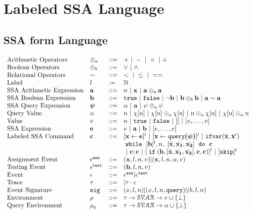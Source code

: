 \section{Labeled SSA Language}
%
%
\subsection{SSA form Language}
\[
\begin{array}{llll}
 \mbox{Arithmetic Operators} 
& \oplus_a & ::= & + ~|~ - ~|~ \times 
%
~|~ \div \\  
\mbox{Boolean Operators} 
& \oplus_b & ::= & \lor ~|~ \land
\\
\mbox{Relational Operators} 
& \sim & ::= & < ~|~ \leq ~|~ == 
\\  
%
\mbox{Label} 
& l & := & \mathbb{N} 
\\ 
%
\mbox{SSA Arithmetic Expression} 
& \saexpr & ::= & 
n ~|~ \ssa{x} ~|~ \saexpr \oplus_a \saexpr  
\\
%
\mbox{SSA Boolean Expression} & \sbexpr & ::= & 
	\etrue ~|~ \efalse  ~|~ \neg \sbexpr
	 ~|~ \sbexpr \oplus_b \sbexpr
	~|~ \saexpr \sim \saexpr 
	\\
%
\mbox{SSA Query Expression} 
& \ssa{\qexpr} & ::= 
& { \qval ~|~ \saexpr ~|~ \qexpr \oplus_a \qexpr} 
\\
%
\mbox{Query Value} & \qval & ::= 
& {n ~|~ \chi[n] ~|~ \chi[n] \oplus_a  \chi[n] ~|~ n \oplus_a  \chi[n]
~|~ \chi[n] \oplus_a  n}
\\
%
\mbox{Value} 
& v & ::= & { n \sep \etrue \sep \efalse ~|~ [] ~|~ [v, \dots, v]}  
\\
%
\mbox{SSA Expression} & \sexpr & ::= & v ~|~ \saexpr \sep \sbexpr ~|~ [\expr, \dots, \expr]
\\	
%
\mbox{Labeled SSA Command} 
& \ssa{c} & ::= &   [\assign {\ssa{x}}{ \ssa{\expr}}]^{l} ~|~  [\assign {\ssa{x} } {\ssa{\query(\qexpr)}}]^{l}
%
~|~  {{\eifvar(\bar{\ssa{x}}, \bar{\ssa{x}}')}} 
%
\\ 
&&& 
{\ewhile ~ [ \sbexpr ]^{l} , n,
~ 
[\bar{\ssa{x}}, \bar{\ssa{x_1}}, \bar{\ssa{x_2}}] 
~ \edo ~  \ssa{c} }
\\
&&&
~|~ \ssa{c};\ssa{c}  
~|~ [\eif(\sbexpr, [\bar{\ssa{x}}, \bar{\ssa{x_1}}, \bar{\ssa{x_2}}] , \ssa{c}, \ssa{c})]^l 
~|~ [\eskip]^{l} 
\\
%
\mbox{Assignment Event} 
& \asnevent & ::= & (\ssa{x}, l, n, v) | (\ssa{x}, l, n, \qval, v)
\\
%
\mbox{Testing Event} 
& \testevent & ::= & (\sbexpr, l, n, v)
\\
%
\mbox{Event} 
& \event & ::= & \asnevent | \testevent
\\
%
\mbox{Trace} & \vtrace
& ::= & | \vtrace \cdot \event
\\
%
\mbox{Event Signature} & \sig
& ::= & (x, l, n) | (x, l, n, \query) | (b, l, n)
\\
%
\mbox{Environment} 
& \env & ::= & \vtrace \to \mathcal{SVAR} \to v \cup \{\bot\}
\\
%
\mbox{Query Environment} 
& \qenv & ::= & \vtrace \to \mathcal{SVAR} \to \qval \cup \{\bot\}
\end{array}
\]
